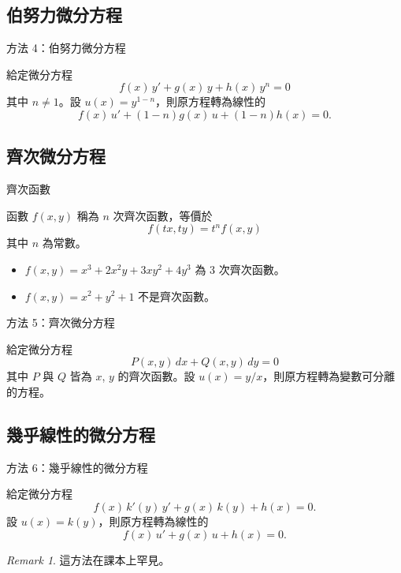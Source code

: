 \documentclass{beamer}
\theoremstyle{remark}
\newtheorem{remark}{Remark}
\begin{document}
\begin{CJK}{UTF8}{bsmi}
\subsection[伯努力]{伯努力微分方程}
\begin{frame}{方法 4：伯努力微分方程}
  \begin{theorem}
    給定微分方程
    \[f(x)\,y' + g(x)\,y + h(x)\,y^n = 0\]
    其中 $n \ne 1$。設 $u(x) = y^{1-n}$，則原方程轉為線性的
    \[f(x)\,u' + \left( 1-n \right) g(x)\,u + \left( 1-n \right) h(x) = 0.\]
  \end{theorem}
\end{frame}

\subsection[齊次]{齊次微分方程}
\begin{frame}{齊次函數}
  \begin{definition}
    函數 $f(x,y)$ 稱為 $n$ 次齊次函數，等價於
    \begin{equation}
      f(tx,ty) = t^n f(x,y) \label{eq:Homogeneity}
    \end{equation}
    其中 $n$ 為常數。
  \end{definition}
  \begin{example}
    \begin{itemize}
      \item $f(x,y) = x^3 + 2x^2y + 3xy^2 + 4y^3$ 為 3 次齊次函數。
      \item $f(x,y) = x^2 + y^2 + 1$ 不是齊次函數。
    \end{itemize}
  \end{example}
\end{frame}

\begin{frame}{方法 5：齊次微分方程}
  \begin{theorem}
    給定微分方程
    \[P(x,y)\,dx + Q(x,y)\,dy = 0\]
    其中 $P$ 與 $Q$ 皆為 $x$, $y$ 的齊次函數。設 $u(x) = y/x$，則原方程轉為變數可分離的方程。
  \end{theorem}
\end{frame}

\subsection[幾乎線性]{幾乎線性的微分方程}
\begin{frame}{方法 6：幾乎線性的微分方程}
  \begin{theorem}
    給定微分方程
    \[f(x)\,k'(y)\,y' + g(x)\,k(y) + h(x)= 0.\]
    設 $u(x) = k(y)$，則原方程轉為線性的
    \[f(x)\,u' + g(x)\,u + h(x) = 0.\]
  \end{theorem}
  \begin{remark}
    這方法在課本上罕見。
  \end{remark}
\end{frame}


\end{CJK}
\end{document}
